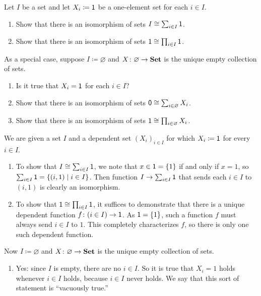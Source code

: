\documentclass[Book-Poly]{subfiles}
\begin{document}
\begin{exercise}\label{exc.on_sums_prods_sets}
Let $I$ be a set and let $X_i\coloneqq\textsf{1}$ be a one-element set for each $i\in I$. 
\begin{enumerate}
	\item \label{exc.on_sums_prods_sets.sum} Show that there is an isomorphism of sets $I\cong\sum_{i\in I}\textsf{1}$.
	\item \label{exc.on_sums_prods_sets.prod} Show that there is an isomorphism of sets $\textsf{1}\cong\prod_{i\in I}\textsf{1}$.
\end{enumerate}
As a special case, suppose $I\coloneqq\varnothing$ and $X\colon \varnothing\to\mathbf{Set}$ is the unique empty collection of sets.
\begin{enumerate}[resume]
	\item Is it true that $X_i=\textsf{1}$ for each $i\in I$?
	\item Show that there is an isomorphism of sets $\textsf{0}\cong\sum_{i\in\varnothing}X_i$.
	\item Show that there is an isomorphism of sets $\textsf{1}\cong\prod_{i\in\varnothing}X_i$.
\qedhere
\end{enumerate}

\begin{solution}
We are given a set $I$ and a dependent set $(X_i)_{i \in I}$ for which $X_i \coloneqq \textsf{1}$ for every $i \in I$.
\begin{enumerate}
    \item \label{sol.on_sums_prods_sets.sum}
    To show that $I \cong \sum_{i \in I} \textsf{1}$, we note that $x \in \textsf{1} = \{1\}$ if and only if $x = 1$, so $\sum_{i \in I} \textsf{1} = \{(i, 1) \mid i \in I\}$.
    Then function $I \to \sum_{i \in I} \textsf{1}$ that sends each $i \in I$ to $(i, 1)$ is clearly an isomorphism.
    
    \item \label{sol.on_sums_prods_sets.prod}
    To show that $\textsf{1} \cong \prod_{i \in I} \textsf{1}$, it suffices to demonstrate that there is a unique dependent function $f \colon (i \in I) \to \textsf{1}$.
    As $\textsf{1} = \{1\}$, such a function $f$ must always send $i \in I$ to $1$.
    This completely characterizes $f$, so there is only one such dependent function.
    
\end{enumerate}
Now $I \coloneqq \varnothing$ and $X \colon \varnothing \to \mathbf{Set}$ is the unique empty collection of sets.
\begin{enumerate}[resume]
    \item \label{sol.on_sums_prods_sets.vac} Yes: since $I$ is empty, there are no $i \in I$.
    So it is true that $X_i = 1$ holds whenever $i \in I$ holds, because $i \in I$ never holds. 
    We say that this sort of statement is ``vacuously true.''
    

\end{enumerate}
\end{solution}
\end{exercise}
\end{document}
